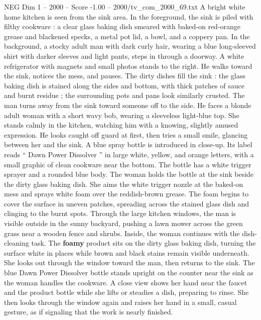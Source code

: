 \begin{textsample}{NEG Dim 1 – 2000 – Score -1.00 – 2000/tv\_com\_2000\_69.txt}  \label{ex:f1_neg_062}
A bright white home kitchen is seen from the sink area.
In the foreground, the sink is piled with filthy cookware : a clear glass baking dish smeared with baked-on red-orange grease and blackened specks, a metal pot lid, a bowl, and a coppery pan.
In the background, a stocky adult man with dark curly hair, wearing a blue long-sleeved shirt with darker sleeves and light pants, steps in through a doorway.
A white refrigerator with magnets and small photos stands to the right.
He walks toward the sink, notices the mess, and pauses.
The dirty dishes fill the sink : the glass baking dish is stained along the sides and bottom, with thick patches of sauce and burnt residue ; the surrounding pots and pans look similarly crusted.
The man turns away from the sink toward someone off to the side.
He faces a blonde adult woman with a short wavy bob, wearing a sleeveless light-blue top.
She stands calmly in the kitchen, watching him with a knowing, slightly amused expression.
He looks caught off guard at first, then tries a small smile, glancing between her and the sink.
A blue spray bottle is introduced in close-up.
Its label reads “ Dawn Power Dissolver ” in large white, yellow, and orange letters, with a small graphic of clean cookware near the bottom.
The bottle has a white trigger sprayer and a rounded blue body.
The woman holds the bottle at the sink beside the dirty glass baking dish.
She aims the white trigger nozzle at the baked-on mess and sprays white foam over the reddish-brown grease.
The foam begins to cover the surface in uneven patches, spreading across the stained glass dish and clinging to the burnt spots.
Through the large kitchen windows, the man is visible outside in the sunny backyard, pushing a lawn mower across the green grass near a wooden fence and shrubs.
Inside, the woman continues with the dish-cleaning task.
The \textbf{foamy} product sits on the dirty glass baking dish, turning the surface white in places while brown and black stains remain visible underneath.
She looks out through the window toward the man, then returns to the sink.
The blue Dawn Power Dissolver bottle stands upright on the counter near the sink as the woman handles the cookware.
A close view shows her hand near the faucet and the product bottle while she lifts or steadies a dish, preparing to rinse.
She then looks through the window again and raises her hand in a small, casual gesture, as if signaling that the work is nearly finished.

\end{textsample}
